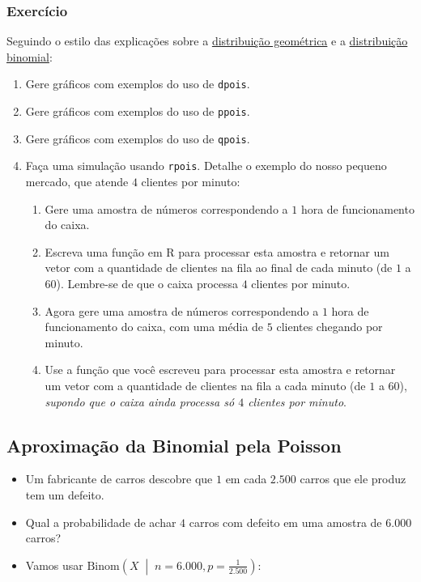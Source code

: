\documentclass[
  11pt]{report}
\begin{document}
\hypertarget{exercuxedcio-3}{%
\subsubsection*{Exercício}\label{exercuxedcio-3}}

Seguindo o estilo das explicações sobre a \protect\hyperlink{em-r-2}{distribuição geométrica} e a \protect\hyperlink{em-r-3}{distribuição binomial}:

\begin{enumerate}
\def\labelenumi{\arabic{enumi}.}
\item
  Gere gráficos com exemplos do uso de \texttt{dpois}.
\item
  Gere gráficos com exemplos do uso de \texttt{ppois}.
\item
  Gere gráficos com exemplos do uso de \texttt{qpois}.
\item
  Faça uma simulação usando \texttt{rpois}. Detalhe o exemplo do nosso pequeno mercado, que atende $4$ clientes por minuto:

  \begin{enumerate}
  \def\labelenumii{\alph{enumii}.}
  \item
    Gere uma amostra de números correspondendo a $1$ hora de funcionamento do caixa.
  \item
    Escreva uma função em R para processar esta amostra e retornar um vetor com a quantidade de clientes na fila ao final de cada minuto (de $1$ a $60$). Lembre-se de que o caixa processa $4$ clientes por minuto.
  \item
    Agora gere uma amostra de números correspondendo a $1$ hora de funcionamento do caixa, com uma média de $5$ clientes chegando por minuto.
  \item
    Use a função que você escreveu para processar esta amostra e retornar um vetor com a quantidade de clientes na fila a cada minuto (de $1$ a $60$), \emph{supondo que o caixa ainda processa só $4$ clientes por minuto}.
  \end{enumerate}
\end{enumerate}

\hypertarget{aproximauxe7uxe3o-da-binomial-pela-poisson}{%
\subsection{Aproximação da Binomial pela Poisson}\label{aproximauxe7uxe3o-da-binomial-pela-poisson}}

\begin{itemize}
\item
  Um fabricante de carros descobre que $1$ em cada $2.500$ carros que ele produz tem um defeito.
\item
  Qual a probabilidade de achar $4$ carros com defeito em uma amostra de $6.000$ carros?
\item
  Vamos usar $\text{Binom}\left(X \;\middle\vert\;n = 6.000, p = \frac{1}{2.500}\right)$:
\end{itemize}
\end{document}
